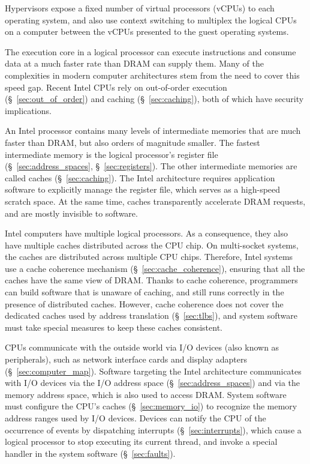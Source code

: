 Hypervisors expose a fixed number of virtual processors (vCPUs) to each
operating system, and also use context switching to multiplex the logical CPUs
on a computer between the vCPUs presented to the guest operating systems.

The execution core in a logical processor can execute instructions and consume
data at a much faster rate than DRAM can supply them. Many of the complexities
in modern computer architectures stem from the need to cover this speed gap.
Recent Intel CPUs rely on out-of-order execution (\S~\ref{sec:out_of_order})
and caching (\S~\ref{sec:caching}), both of which have security implications.

An Intel processor contains many levels of intermediate memories that are much
faster than DRAM, but also orders of magnitude smaller.  The fastest
intermediate memory is the logical processor's register file
(\S~\ref{sec:address_spaces}, \S~\ref{sec:registers}). The other intermediate
memories are called caches (\S~\ref{sec:caching}). The Intel architecture
requires application software to explicitly manage the register file, which
serves as a high-speed scratch space. At the same time, caches transparently
accelerate DRAM requests, and are mostly invisible to software.

Intel computers have multiple logical processors. As a consequence, they also
have multiple caches distributed across the CPU chip. On multi-socket systems,
the caches are distributed across multiple CPU chips. Therefore, Intel systems
use a cache coherence mechanism (\S~\ref{sec:cache_coherence}), ensuring that
all the caches have the same view of DRAM. Thanks to cache coherence,
programmers can build software that is unaware of caching, and still runs
correctly in the presence of distributed caches. However, cache coherence does
not cover the dedicated caches used by address translation (\S~\ref{sec:tlbs}),
and system software must take special measures to keep these caches consistent.

CPUs communicate with the outside world via I/O devices (also known as
peripherals), such as network interface cards and display adapters
(\S~\ref{sec:computer_map}). Software targeting the Intel architecture
communicates with I/O devices via the I/O address space
(\S~\ref{sec:address_spaces}) and via the memory address space, which is also
used to access DRAM. System software must configure the CPU's caches
(\S~\ref{sec:memory_io}) to recognize the memory address ranges used by I/O
devices. Devices can notify the CPU of the occurrence of events by dispatching
interrupts (\S~\ref{sec:interrupts}), which cause a logical processor to stop
executing its current thread, and invoke a special handler in the system
software (\S~\ref{sec:faults}).

